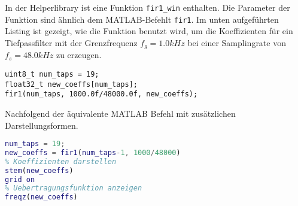 In der Helperlibrary ist eine Funktion \texttt{fir1\_win} enthalten.
Die Parameter der Funktion sind ähnlich dem MATLAB-Befehlt \texttt{fir1}.
Im unten aufgeführten Listing ist gezeigt, wie die Funktion benutzt wird, um die Koeffizienten für ein Tiefpassfilter mit der Grenzfrequenz $f_g=1.0\si{kHz}$ bei einer Samplingrate von $f_s=48.0\si{kHz}$ zu erzeugen.



\begin{lstlisting}[style=Cuvision, caption={Berechnung von 19 Koeffizienten in C}]
uint8_t num_taps = 19;
float32_t new_coeffs[num_taps];
fir1(num_taps, 1000.0f/48000.0f, new_coeffs);
\end{lstlisting}


Nachfolgend der äquivalente MATLAB Befehl mit zusätzlichen Darstellungsformen.

\begin{lstlisting}[language=matlab, caption={Berechnung von 19 Koeffizienten in MATLAB}]
num_taps = 19;
new_coeffs = fir1(num_taps-1, 1000/48000)
% Koeffizienten darstellen
stem(new_coeffs)
grid on
% Uebertragungsfunktion anzeigen
freqz(new_coeffs)
\end{lstlisting}



